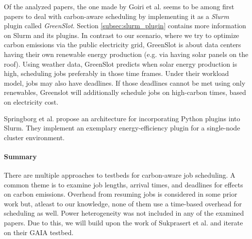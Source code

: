 Of the analyzed papers, the one made by Goiri et al. \cite{inigo_goiri_greenslot_2011} seems to be among first papers to deal with carbon-aware scheduling by implementing it as a \emph{Slurm} plugin called \emph{GreenSlot}. 
Section \ref{subsec:slurm_plugin} contains more information on Slurm and its plugins.
In contrast to our scenario, where we try to optimize carbon emissions via the public electricity grid, GreenSlot is about data centers having their own renewable energy production (e.g. via having solar panels on the roof). 
Using weather data, GreenSlot predicts when solar energy production is high, scheduling jobs preferably in those time frames.
Under their workload model, jobs may also have deadlines.
If those deadlines cannot be met using only renewables, Greenslot will additionally schedule jobs on high-carbon times, based on electricity cost.

Springborg et al. \cite{aaen_springborg_automatic_2023} propose an architecture for incorporating Python plugins into Slurm. 
They implement an exemplary energy-efficiency plugin for a single-node cluster environment. 

\paragraph{Summary}
There are multiple approaches to testbeds for carbon-aware job scheduling. 
A common theme is to examine job lengths, arrival times, and deadlines for effects on carbon emissions. 
Overhead from resuming jobs is considered in some prior work but, atleast to our knowledge, none of them use a time-based overhead for scheduling as well. 
Power heterogeneity was not included in any of the examined papers.
Due to this, we will build upon the work of Sukprasert et al. \cite{sukprasert_limitations_2024} and iterate on their GAIA testbed.
